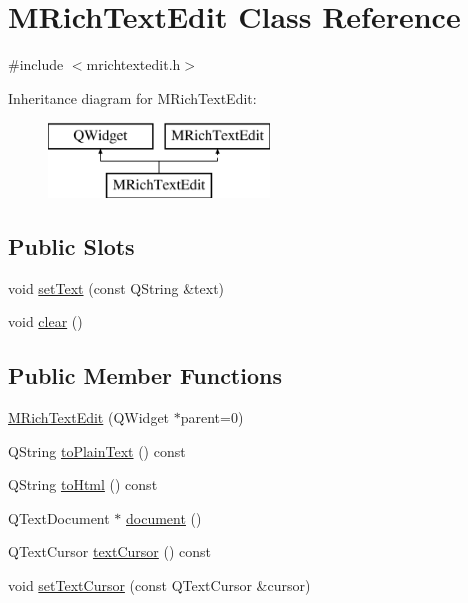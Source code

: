 \hypertarget{class_m_rich_text_edit}{}\section{M\+Rich\+Text\+Edit Class Reference}
\label{class_m_rich_text_edit}


{\ttfamily \#include $<$mrichtextedit.\+h$>$}

Inheritance diagram for M\+Rich\+Text\+Edit\+:\begin{figure}[H]
\begin{center}
\leavevmode
\includegraphics[height=2.000000cm]{class_m_rich_text_edit}
\end{center}
\end{figure}
\subsection*{Public Slots}
\begin{DoxyCompactItemize}
\item 
void \hyperlink{class_m_rich_text_edit_a399d16bc18b366934c362ffacfb1a451}{set\+Text} (const Q\+String \&text)
\item 
void \hyperlink{class_m_rich_text_edit_a210d75555284692accb06b8dfc9820e6}{clear} ()
\end{DoxyCompactItemize}
\subsection*{Public Member Functions}
\begin{DoxyCompactItemize}
\item 
\hyperlink{class_m_rich_text_edit_a17d69881746fcd8de24674a5b862081a}{M\+Rich\+Text\+Edit} (Q\+Widget $\ast$parent=0)
\item 
Q\+String \hyperlink{class_m_rich_text_edit_a9dba18134faf345cdb5079529d1ad158}{to\+Plain\+Text} () const 
\item 
Q\+String \hyperlink{class_m_rich_text_edit_af53834cc21071819221cf47a024ce1fb}{to\+Html} () const 
\item 
Q\+Text\+Document $\ast$ \hyperlink{class_m_rich_text_edit_a93b86da18d5dd7c10ebac3aecbdd83b6}{document} ()
\item 
Q\+Text\+Cursor \hyperlink{class_m_rich_text_edit_abdede60f4b801a66ed108f880df45de3}{text\+Cursor} () const 
\item 
void \hyperlink{class_m_rich_text_edit_a6a7a2a2cc996141c4e2b61df54933ac7}{set\+Text\+Cursor} (const Q\+Text\+Cursor \&cursor)
\end{DoxyCompactItemize}
